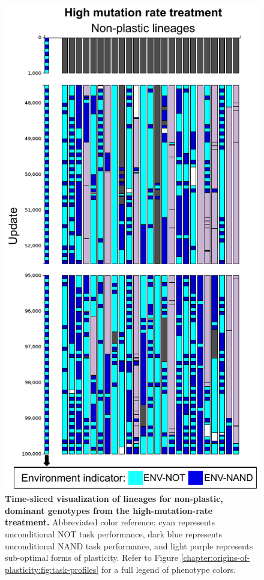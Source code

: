 \begin{figure}[ht!]
  \centering
  \includegraphics[height=0.65\textheight, keepaspectratio]{chapters/02-evolutionary-origins-of-plasticity/media/high-mutation-rate-non-plastic-lineages.pdf}
  \caption{\small 
  \textbf{Time-sliced visualization of lineages for non-plastic, dominant genotypes from the high-mutation-rate treatment.}
  Abbreviated color reference: 
  cyan represents unconditional NOT task performance, 
  dark blue represents unconditional NAND task performance, 
  and light purple represents sub-optimal forms of plasticity.  
  Refer to Figure \ref{chapter:origins-of-plasticity:fig:task-profiles} for a full legend of phenotype colors.}
  \label{chapter:origins-of-plasticity:fig:high-mut-lineages}
\end{figure}

